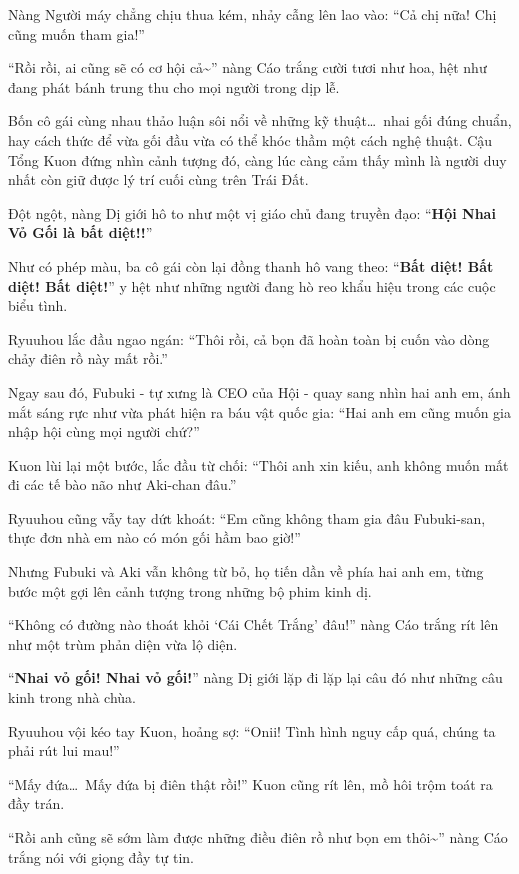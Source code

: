 \documentclass[../main.tex]{subfiles}
\begin{document}
Nàng Người máy chẳng chịu thua kém, nhảy cẫng lên lao vào: ``Cả chị nữa! Chị cũng muốn tham gia!''

``Rồi rồi, ai cũng sẽ có cơ hội cả\~{}'' nàng Cáo trắng cười tươi như hoa, hệt như đang phát bánh trung thu cho mọi người trong dịp lễ.

Bốn cô gái cùng nhau thảo luận sôi nổi về những kỹ thuật\dots\ nhai gối đúng chuẩn, hay cách thức để vừa gối đầu vừa có thể khóc thầm một cách nghệ thuật. Cậu Tổng Kuon đứng nhìn cảnh tượng đó, càng lúc càng cảm thấy mình là người duy nhất còn giữ được lý trí cuối cùng trên Trái Đất.

Đột ngột, nàng Dị giới hô to như một vị giáo chủ đang truyền đạo: ``\textbf{Hội Nhai Vỏ Gối là bất diệt!!}''

Như có phép màu, ba cô gái còn lại đồng thanh hô vang theo: ``\textbf{Bất diệt! Bất diệt! Bất diệt!}'' y hệt như những người đang hò reo khẩu hiệu trong các cuộc biểu tình.

Ryuuhou lắc đầu ngao ngán: ``Thôi rồi, cả bọn đã hoàn toàn bị cuốn vào dòng chảy điên rồ này mất rồi.''

Ngay sau đó, Fubuki - tự xưng là CEO của Hội - quay sang nhìn hai anh em, ánh mắt sáng rực như vừa phát hiện ra báu vật quốc gia: ``Hai anh em cũng muốn gia nhập hội cùng mọi người chứ?''

Kuon lùi lại một bước, lắc đầu từ chối: ``Thôi anh xin kiếu, anh không muốn mất đi các tế bào não như Aki-chan đâu.''

Ryuuhou cũng vẫy tay dứt khoát: ``Em cũng không tham gia đâu Fubuki-san, thực đơn nhà em nào có món gối hầm bao giờ!''

Nhưng Fubuki và Aki vẫn không từ bỏ, họ tiến dần về phía hai anh em, từng bước một gợi lên cảnh tượng trong những bộ phim kinh dị.

``Không có đường nào thoát khỏi `Cái Chết Trắng' đâu!'' nàng Cáo trắng rít lên như một trùm phản diện vừa lộ diện.

``\textbf{Nhai vỏ gối! Nhai vỏ gối!}'' nàng Dị giới lặp đi lặp lại câu đó như những câu kinh trong nhà chùa.

Ryuuhou vội kéo tay Kuon, hoảng sợ: ``Onii! Tình hình nguy cấp quá, chúng ta phải rút lui mau!''

``Mấy đứa\dots\ Mấy đứa bị điên thật rồi!'' Kuon cũng rít lên, mồ hôi trộm toát ra đầy trán.

``Rồi anh cũng sẽ sớm làm được những điều điên rồ như bọn em thôi\~{}'' nàng Cáo trắng nói với giọng đầy tự tin.
\end{document}
